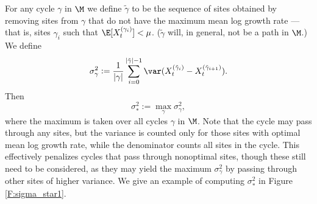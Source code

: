 \documentclass[11pt]{amsart}
\begin{document}
For any cycle $\gamma$ in $\M$ we define
$\tilde\gamma$ to be the sequence of sites obtained
by removing sites from $\gamma$ that do not have the
maximum mean log growth rate --- that is, sites $\gamma_i$ such that $\E[X_t^{(\gamma_i)}]<\mu$.
($\tilde\gamma$ will, in general, not be a path in $\M$.)
We define
$$
	\sigma_\gamma^2 :=  \frac{1}{|\gamma|}\sum_{i=0}^{|\tilde\gamma|-1}\var ( X_t^{(\tilde\gamma_i)}- X_t^{(\tilde\gamma_{i+1})}).
$$
Then
\begin{equation} \label{E:definesigma}
\sigma_*^2 := \max_\gamma \sigma_\gamma^2,
\end{equation}
where the maximum is taken over all cycles $\gamma$ in 
$\M$. 
Note that the cycle may pass through any sites, but the variance is counted only for those sites with
optimal mean log growth rate, while the denominator
counts all sites in the cycle. 
This effectively penalizes cycles that pass through nonoptimal sites, though these still need to be considered, as they may yield
the maximum $\sigma_\gamma^2$ by passing through
other sites of higher variance.  
We give an example of computing $\sigma_*^2$ in Figure \ref{F:sigma_star1}.
\end{document}
